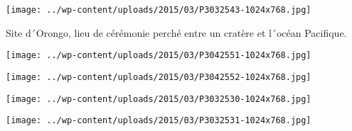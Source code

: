  \newline
\centerline{\texttt{[image: ../wp-content/uploads/2015/03/P3032543-1024x768.jpg]} } 
 \newline
 Site d´Orongo, lieu de cérémonie perché entre un cratère et l´océan Pacifique. \newline
 \newline
\centerline{\texttt{[image: ../wp-content/uploads/2015/03/P3042551-1024x768.jpg]} } 
 \newline
\centerline{\texttt{[image: ../wp-content/uploads/2015/03/P3042552-1024x768.jpg]} } 
 \newline
 \newline
\centerline{\texttt{[image: ../wp-content/uploads/2015/03/P3032530-1024x768.jpg]} } 
 \newline
\centerline{\texttt{[image: ../wp-content/uploads/2015/03/P3032531-1024x768.jpg]} } 
 \newline
  \newline
  \newline
  \newline
  \newline
  \newline
  \newline
  \newline

\newpage
 
